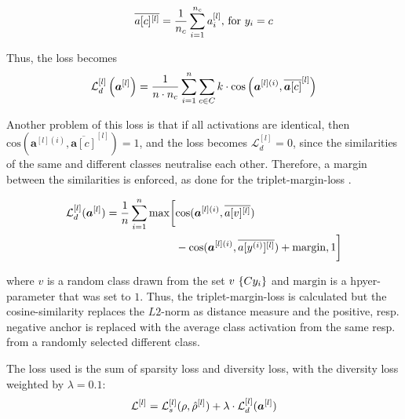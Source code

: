 \begin{align}\eqlbl{vso_8}
		\overline{a[c]^{[l]}} = \frac{1}{n_c} \sum_{i=1}^{n_c} a^{[l]}_i \text{, for } y_i = c
\end{align}

Thus, the loss becomes
\begin{align}\eqlbl{vso_80}
		\mathcal{L}^{[l]}_{d} \left(\boldsymbol{a}^{[l]} \right) = \frac{1}{n\cdot n_c} \sum_{i=1}^{n} \sum_{c \in C} k \cdot \text{cos} \left( \boldsymbol{a}^{[l](i)}, \overline{\boldsymbol{a}[c]}^{[l]} \right)
\end{align}

Another problem of this loss is that if all activations are identical, then $\text{cos} \left(\boldsymbol{a}^{[l](i)}, \overline{\boldsymbol{a}[c]}^{[l]} \right) = 1$, and the loss becomes $\mathcal{L}^{[l]}_{d}=0$, since the similarities of the same and different classes neutralise each other.
Therefore, a margin between the similarities is enforced, as done for the triplet-margin-loss  .

\begin{align}\eqlbl{vso_9}
\begin{split}
		\mathcal{L}^{[l]}_{d}(\boldsymbol{a}^{[l]}) = \frac{1}{n} \sum_{i=1}^{n} \max \biggl[ & \text{cos}(\boldsymbol{a}^{[l](i)}, \overline{a[v]^{[l]}}) \\
		& - \text{cos}(\boldsymbol{a}^{[l](i)}, \overline{a[y^{(i)}]^{[l]}}) + \text{margin}, 1 \biggr]
\end{split}
\end{align}

where $v$ is a random class drawn from the set $v ~ \{C \\ y_i\}$ and $\text{margin}$ is a hpyer-parameter that was set to $1$.
Thus, the triplet-margin-loss is calculated but the cosine-similarity replaces the $L2$-norm as distance measure and the positive, resp. negative anchor is replaced with the average class activation from the same resp. from a randomly selected different class.

The loss used is the sum of sparsity loss and diversity loss, with the diversity loss weighted by $\lambda=0.1$:
\begin{align}\eqlbl{vso_10}
		\mathcal{L}^{[l]} =\mathcal{L}^{[l]}_{s}(\rho, \hat{\rho}^{[l]}) 
 + \lambda \cdot \mathcal{L}^{[l]}_{d}(\boldsymbol{a}^{[l]})
\end{align}


